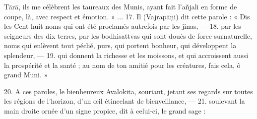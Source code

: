 \documentclass[a4paper, 11pt, oneside, french]{article}
\begin{document}
T\={a}r\={a}, ils me célèbrent les taureaux des Munis, ayant fait l'a\~{n}jali en forme de coupe, là, avec respect et émotion. » ... 17. Il (Vajrap\={a}\d{n}i) dit cette parole : « Dis les Cent huit noms qui ont été proclamés autrefois par les jinas, --- 18. par les seigneurs des dix terres, par les bodhisattvas qui sont doués de force surnaturelle, noms qui enlèvent tout péché, purs, qui portent bonheur, qui développent la splendeur, --- 19. qui donnent la richesse et les moissons, et qui accroissent aussi la prospérité et la santé ; au nom de ton amitié pour les créatures, fais cela, ô grand Muni. »

20. A ces paroles, le bienheureux Avalokita, souriant, jetant ses regards sur toutes les régions de l'horizon, d'un œil étincelant de bienveillance, --- 21. soulevant la main droite ornée d'un signe propice, dit à celui-ci, le grand sage :
\end{document}
